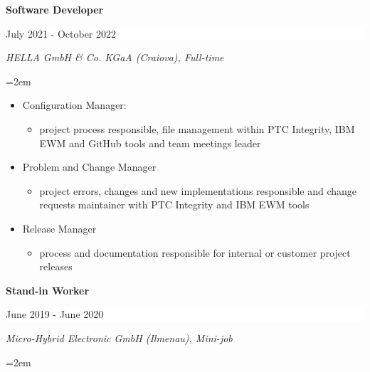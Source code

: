 \documentclass[paper=a4,fontsize=10.9pt]{scrartcl} %
\newcommand{\sepspace}{\vspace*{0.5em}}		%
\newcommand{\EducationEntry}[4]{
		\noindent \textbf{#1} \hfill      %
		\colorbox{White}{%
			\parbox{16em}{%
			\hfill\color{Black}#2}} \par  %
		\noindent \textit{#3} \par        %
		\noindent\hangindent=2em\hangafter=0 \small #4 %
		\normalsize \par}
\begin{document}
\EducationEntry{\color[HTML]{6a040f}Software Developer}{July 2021 - October 2022}{HELLA GmbH \& Co. KGaA (Craiova), Full-time}{
\begin{itemize}
	\item{Configuration Manager: 
\begin{itemize}
	\item{project process responsible, file management within PTC Integrity, IBM EWM and GitHub tools and team meetings leader}
\end{itemize}
	}
	\item{Problem and Change Manager}
	\begin{itemize}
		\item{project errors, changes and new implementations responsible and change requests maintainer with PTC Integrity and IBM EWM tools}
	\end{itemize}
	\item{Release Manager}
	\begin{itemize}
		\item{process and documentation responsible for internal or customer project releases}
	\end{itemize}


\end{itemize}}
\sepspace

\EducationEntry{\color[HTML]{6a040f}Stand-in Worker}{June 2019 - June 2020}{Micro-Hybrid Electronic GmbH (Ilmenau), Mini-job}{
%
%	
}
\end{document}
